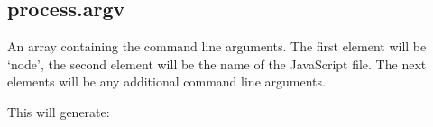 \begin{Shaded}
\begin{Highlighting}[]
\NormalTok{();}
\NormalTok{(}\NormalTok{);}

\NormalTok{(}\NormalTok{, } 
  \NormalTok{(} 
\NormalTok{\});}

\NormalTok{(}\NormalTok{, } \NormalTok{() \{}
  \NormalTok{(}\NormalTok{);}
\NormalTok{\});}
\end{Highlighting}
\end{Shaded}

\subsection{process.argv}

An array containing the command line arguments. The first element will
be `node', the second element will be the name of the JavaScript file.
The next elements will be any additional command line arguments.

\begin{Shaded}
\begin{Highlighting}[]
\NormalTok{(} 
   
\NormalTok{\});}
\end{Highlighting}
\end{Shaded}

This will generate:

\begin{Shaded}
\begin{Highlighting}[]
\NormalTok{: }\OtherTok{/}\OtherTok{/}
\end{Highlighting}
\end{Shaded}

